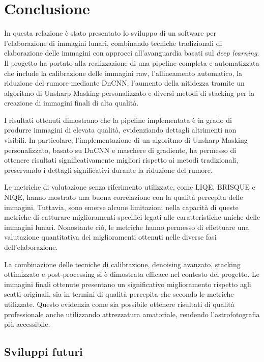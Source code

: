 \chapter*{Conclusione}

In questa relazione è stato presentato lo sviluppo di un software per l'elaborazione di immagini lunari, combinando tecniche tradizionali di elaborazione delle immagini con approcci all'avanguardia basati sul \textit{deep learning}. Il progetto ha portato alla realizzazione di una pipeline completa e automatizzata che include la calibrazione delle immagini raw, l'allineamento automatico, la riduzione del rumore mediante DnCNN, l'aumento della nitidezza tramite un algoritmo di Unsharp Masking personalizzato e diversi metodi di stacking per la creazione di immagini finali di alta qualità.

I risultati ottenuti dimostrano che la pipeline implementata è in grado di produrre immagini di elevata qualità, evidenziando dettagli altrimenti non visibili. In particolare, l'implementazione di un algoritmo di Unsharp Masking personalizzato, basato su DnCNN e maschere di gradiente, ha permesso di ottenere risultati significativamente migliori rispetto ai metodi tradizionali, preservando i dettagli significativi durante la riduzione del rumore.

Le metriche di valutazione senza riferimento utilizzate, come LIQE, BRISQUE e NIQE, hanno mostrato una buona correlazione con la qualità percepita delle immagini. Tuttavia, sono emerse alcune limitazioni nella capacità di queste metriche di catturare miglioramenti specifici legati alle caratteristiche uniche delle immagini lunari. Nonostante ciò, le metriche hanno permesso di effettuare una valutazione quantitativa dei miglioramenti ottenuti nelle diverse fasi dell'elaborazione.

La combinazione delle tecniche di calibrazione, denoising avanzato, stacking ottimizzato e post-processing si è dimostrata efficace nel contesto del progetto. Le immagini finali ottenute presentano un significativo miglioramento rispetto agli scatti originali, sia in termini di qualità percepita che secondo le metriche utilizzate. Questo evidenzia come sia possibile ottenere risultati di qualità professionale anche utilizzando attrezzatura amatoriale, rendendo l'astrofotografia più accessibile.

\section*{Sviluppi futuri}

